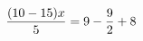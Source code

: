 \documentclass[preview]{standalone}
\begin{document}
\begin{align*}
\special{dvisvgm:raw <g id='unique000'>}\frac{(10 - 15) x}{5} = 9 - \frac{9}{2} + 8\special{dvisvgm:raw </g>}
\end{align*}
\end{document}
